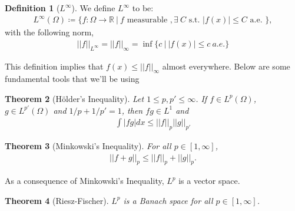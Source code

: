 \documentclass[psamsfonts]{amsart}
\newcommand{\given}{\ |\ }
\newtheorem{thm}{Theorem}[section]
\theoremstyle{definition}
\newtheorem{defn}[thm]{Definition}
\theoremstyle{remark}
\newcommand{\R}[0]{\mathbb{R}}
\numberwithin{equation}{section}
\begin{document}
\begin{defn}[\( L^\infty \)]
		We define \(L^\infty\) to be: 
		\begin{align}
			L^\infty(\Omega) \coloneqq \{ f: \Omega \to \R \given f \text{ measurable }, \exists\ C \text{ s.t. } |f(x)| \leq C \text{ a.e. } \}, 	
		\end{align}
		with the following norm, 
		\begin{align}
			||f||_{L^\infty} = || f||_\infty = \inf \{ c\ |\ |f(x)| \leq c\ a.e. \} 	
		\end{align}
\end{defn}
This definition implies that \( f(x) \leq || f||_\infty \) almost everywhere. Below are some fundamental tools that we'll be using
\begin{thm}[Hölder's Inequality]
		Let \( 1 \leq p, p' \leq \infty \). If \( f \in L^p(\Omega) \), \( g \in L^{p'}(\Omega) \) and \( 1/p + 1/p' = 1 \), then \( fg \in L^1 \) and
		\begin{align}
			\boxed{\int|fg|dx \leq ||f||_p ||g||_{p'}}	
		\end{align}
\end{thm}

\begin{thm}[Minkowski's Inequality]
	For all \( p \in [1, \infty] \), 
	\begin{align}
		\boxed{||f+g||_p \leq ||f||_p + ||g||_p.} 	
	\end{align}
\end{thm}
As a consequence of Minkowski's Inequality, \(L^p \) is a vector space.

\begin{thm}[Riesz-Fischer] 
	\( L^p \) is a Banach space for all \( p \in [1, \infty] \).
\end{thm}
\end{document}
